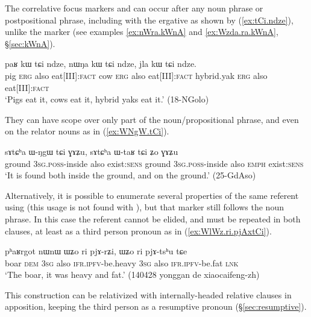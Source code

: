The correlative focus markers  and  can occur after any noun phrase or postpositional phrase, including with the ergative   as shown by (\ref{ex:tCi.ndze}), unlike the marker  (see examples \ref{ex:nWra.kWnA} and \ref{ex:Wzda.ra.kWnA}, §\ref{sec:kWnA}).
  
  \begin{exe}
\ex \label{ex:tCi.ndze}
 \gll paʁ kɯ tɕi ndze, nɯŋa kɯ tɕi ndze, jla kɯ tɕi ndze.   \\
 pig \textsc{erg} also eat[III]:\textsc{fact}  cow \textsc{erg} also eat[III]:\textsc{fact}  hybrid.yak \textsc{erg} also eat[III]:\textsc{fact}  \\
 \glt `Pigs eat it, cows eat it, hybrid yaks eat it.' (18-NGolo)
  \end{exe}

They can have scope over only part of the noun/propositional phrase, and even on the relator nouns as in (\ref{ex:WNgW.tCi}).

   \begin{exe}
\ex \label{ex:WNgW.tCi}
 \gll   sɤtɕʰa ɯ-ŋgɯ tɕi ɣɤʑu, sɤtɕʰa ɯ-taʁ tɕi ʑo ɣɤʑu \\
 ground \textsc{3sg}.\textsc{poss}-inside also exist:\textsc{sens}  ground \textsc{3sg}.\textsc{poss}-inside also \textsc{emph} exist:\textsc{sens} \\
 \glt `It is found both inside the ground, and on the ground.' (25-GdAso)
    \end{exe}
    
Alternatively, it is possible to enumerate several properties of the same referent using  (this usage is not found with ), but that marker still follows the noun phrase. In this case the referent cannot be elided, and must be repeated in both clauses, at least as a third person pronoun  as in (\ref{ex:WlWz.ri.pjAxtCi}). 

  \begin{exe}
\ex \label{ex:WlWz.ri.pjArZi}
 \gll pʰaʁrgot nɯnɯ ɯʑo ri pjɤ-rʑi, ɯʑo ri pjɤ-tsʰu tɕe \\
 boar \textsc{dem} \textsc{3sg} also \textsc{ifr}.\textsc{ipfv}-be.heavy \textsc{3sg} also \textsc{ifr}.\textsc{ipfv}-be.fat \textsc{lnk} \\ 
\glt  `The boar, it was heavy and fat.' (140428 yonggan de xiaocaifeng-zh)
 \end{exe}

This construction can be relativized with internally-headed relative clauses in apposition, keeping the third person  as a resumptive pronoun (§\ref{sec:resumptive}).

